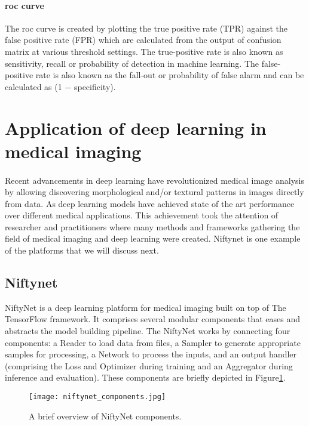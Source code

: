 \paragraph{\acs{roc} curve}
The \acs{roc} curve is created by plotting the true positive rate (TPR) against the false positive rate (FPR) which are calculated from the output of confusion matrix at various threshold settings. The true-positive rate is also known as sensitivity, recall or probability of detection in machine learning. The false-positive rate is also known as the fall-out or probability of false alarm and can be calculated as (1 − specificity).
\section{Application of deep learning in medical imaging}
\paragraph{}
Recent advancements in deep learning have revolutionized medical image analysis by allowing discovering morphological and/or textural patterns in images directly from data. As deep learning models have achieved state of the art performance over different medical applications. This achievement took the attention of researcher and practitioners where many methods and frameworks gathering the field of medical imaging and deep learning were created. Niftynet is one example of the platforms that we will discuss next.
\subsection{Niftynet}
NiftyNet is a deep learning platform for medical imaging built on top of The TensorFlow framework\cite{tensorflow}. It comprises several modular components that eases and abstracts the model building pipeline. The NiftyNet works by connecting four components: a Reader to load data from files, a Sampler to generate appropriate samples for processing, a Network to process the inputs, and an output handler (comprising the Loss and Optimizer during training and an Aggregator during inference and evaluation). These components are briefly depicted in Figure\ref{niftynet_components}.\cite{niftyNet}
\begin{figure}[ht]
 \texttt{[image: niftynet\_components.jpg]}
 \centering         
 \caption{A brief overview of NiftyNet components\cite{niftyNet}.}
 \label{niftynet_components}
\end{figure}

